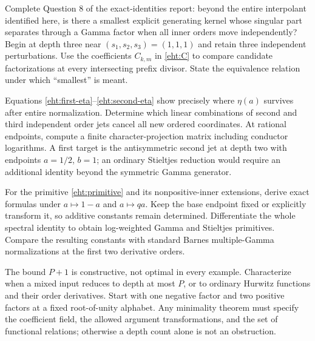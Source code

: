 \begin{question}
Complete Question 8 of the exact-identities report: beyond the entire
interpolant identified here, is there a smallest explicit generating
kernel whose singular part separates through a Gamma factor when
all inner orders move independently? Begin at depth three near
$(s_1,s_2,s_3)=(1,1,1)$ and retain three independent perturbations.
Use the coefficients $C_{k,m}$ in \eqref{eht:C} to compare candidate
factorizations at every intersecting prefix divisor. State the
equivalence relation under which ``smallest'' is meant.
\end{question}

\begin{question}
Equations \eqref{eht:first-eta}--\eqref{eht:second-eta} show precisely
where $\eta(a)$ survives after entire normalization. Determine which
linear combinations of second and third independent order jets cancel
all new ordered coordinates. At rational endpoints, compute a finite
character-projection matrix including conductor logarithms. A first
target is the antisymmetric second jet at depth two with endpoints
$a=1/2$, $b=1$; an ordinary Stieltjes reduction would require an
additional identity beyond the symmetric Gamma generator.
\end{question}

\begin{question}
For the primitive \eqref{eht:primitive} and its nonpositive-inner
extensions, derive exact formulas under $a\mapsto1-a$ and
$a\mapsto qa$. Keep the base endpoint fixed or explicitly transform
it, so additive constants remain determined. Differentiate the whole
spectral identity to obtain log-weighted Gamma and Stieltjes
primitives. Compare the resulting constants with standard Barnes
multiple-Gamma normalizations at the first two derivative orders.
\end{question}

\begin{question}
The bound $P+1$ is constructive, not optimal in every example.
Characterize when a mixed input reduces to depth at most $P$, or to
ordinary Hurwitz functions and their order derivatives. Start with
one negative factor and two positive factors at a fixed root-of-unity
alphabet. Any minimality theorem must specify the coefficient field,
the allowed argument transformations, and the set of functional
relations; otherwise a depth count alone is not an obstruction.
\end{question}

